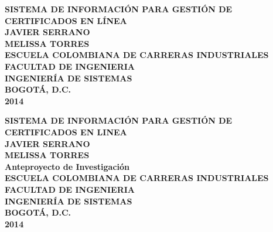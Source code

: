\begin{titlepage}
\newpage
\setlength{\parindent}{0pt} \setlength{\parskip}{0pt}

\begin{center}

\textbf{SISTEMA DE INFORMACI\'ON PARA GESTI\'ON DE CERTIFICADOS EN L\'INEA\\[8cm] JAVIER SERRANO\\ MELISSA TORRES}\\[10cm]



\textbf{ESCUELA COLOMBIANA DE CARRERAS INDUSTRIALES\\FACULTAD DE INGENIERIA\\INGENIER\'IA DE SISTEMAS\\BOGOT\'A, D.C.\\2014}
\end{center}
%
\newpage
\setlength{\parindent}{0pt} \setlength{\parskip}{0pt}
\begin{center}

\textbf{SISTEMA DE INFORMACI\'ON PARA GESTI\'ON DE CERTIFICADOS EN LINEA\\[5cm] JAVIER SERRANO\\ MELISSA TORRES\\[4cm]Anteproyecto de Investigaci\'on}\\[8cm]



\textbf{ESCUELA COLOMBIANA DE CARRERAS INDUSTRIALES\\FACULTAD DE INGENIERIA\\INGENIER\'IA DE SISTEMAS\\BOGOT\'A, D.C.\\2014}
\end{center}
\end{titlepage}